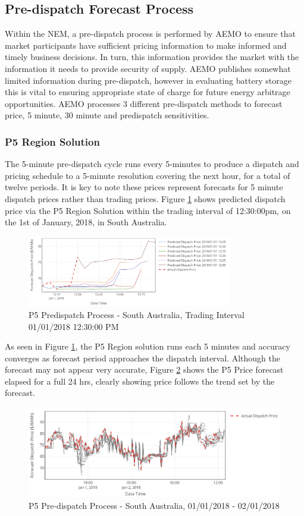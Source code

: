 \subsection{ Pre-dispatch Forecast Process }
Within the NEM, a pre-dispatch process is performed by AEMO to ensure that market participants have sufficient pricing information to make informed and timely business decisions. In turn, this information provides the market with the information it needs to provide security of supply.  AEMO publishes somewhat limited information during pre-dispatch, however in evaluating battery storage this is vital to ensuring appropriate state of charge for future energy arbitrage opportunities. AEMO processes 3 different pre-dispatch methods to forecast price, 5 minute, 30 minute and predispatch sensitivities.
\subsubsection{P5 Region Solution}
\label{sec:background_p5}
The 5-minute pre-dispatch cycle runs every 5-minutes to produce a dispatch and pricing schedule to a 5-minute resolution covering the next hour, for a total of twelve periods. It is key to note these prices represent forecasts for 5 minute dispatch prices rather than trading prices. Figure \ref{fig:p5_process_1} shows predicted dispatch price via the P5 Region Solution within the trading interval of 12:30:00pm, on the 1st of January, 2018, in South Australia. 
\begin{figure}[H]
\centering
\includegraphics[width=0.8\textwidth]{Pictures/Chapter2/P5_Process.png}
\caption{P5 Predispatch Process - South Australia, Trading Interval 01/01/2018 12:30:00 PM}
\label{fig:p5_process_1}
\end{figure}
As seen in Figure \ref{fig:p5_process_1}, the P5 Region solution runs each 5 minutes and accuracy converges as forecast period approaches the dispatch interval. Although the forecast may not appear very accurate, Figure \ref{fig:p5_process_2} shows the P5 Price forecast elapsed for a full 24 hrs, clearly showing price follows the trend set by the forecast. 
\begin{figure}[H]
\centering
\includegraphics[width=1\textwidth]{Pictures/Chapter2/P5_Process_2.png}
\caption{P5 Pre-dispatch Process - South Australia, 01/01/2018 - 02/01/2018}
\label{fig:p5_process_2}
\end{figure}
